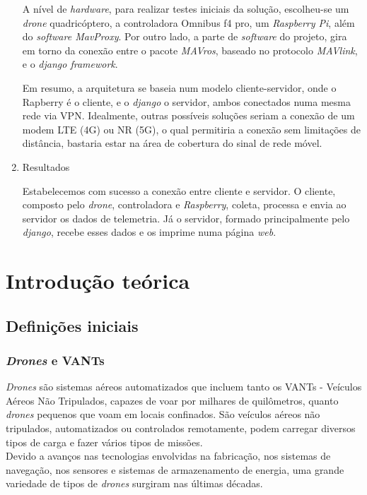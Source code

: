 \documentclass[12pt,a4paper,oneside]{book}
\begin{document}
\begin{enumerate}
     A nível de \textit{hardware}, para realizar testes iniciais da 
     solução, escolheu-se um \textit{drone} quadricóptero, a controladora 
     Omnibus f4 pro, um \textit{Raspberry Pi}, além do \textit{software MavProxy}. 
     Por outro lado, a parte de \textit{software} do projeto, gira em torno
     da conexão entre o pacote \textit{MAVros}, baseado no protocolo 
     \textit{MAVlink}, e o \textit{django framework}.
     
     Em resumo, a
     arquitetura se baseia num modelo cliente-servidor, onde o Rapberry
     é o cliente, e o \textit{django} o servidor, ambos conectados numa mesma
     rede via VPN. Idealmente, outras possíveis soluções seriam a conexão de
     um modem LTE (4G) ou NR (5G), o qual permitiria a conexão sem limitações de 
     distância, bastaria estar na área de cobertura do sinal de rede móvel.

     \item Resultados
     
     Estabelecemos com sucesso a conexão entre cliente e servidor. O cliente, composto
     pelo \textit{drone}, controladora e \textit{Raspberry}, coleta, processa e envia ao servidor os
     dados de telemetria. Já o servidor, formado principalmente pelo \textit{django},
     recebe esses dados e os imprime numa página \textit{web}.



\end{enumerate}




%

\chapter{Introdução teórica}
%
\thispagestyle{empty} 
%


\section{Definições iniciais}

\subsection{\textit{Drones} e VANTs}
\textit{Drones} são sistemas aéreos automatizados que incluem tanto os VANTs - Veículos Aéreos Não Tripulados, capazes de voar por milhares de 
quilômetros, quanto \textit{drones} pequenos que voam em locais confinados. São veículos aéreos não tripulados, automatizados ou controlados 
remotamente, podem carregar diversos tipos de carga e fazer vários tipos de missões.\\
Devido a avanços nas tecnologias envolvidas na fabricação, nos sistemas de navegação, nos sensores e sistemas de armazenamento de 
energia, uma grande variedade de tipos de \textit{drones} surgiram nas últimas décadas. 
\end{document}
